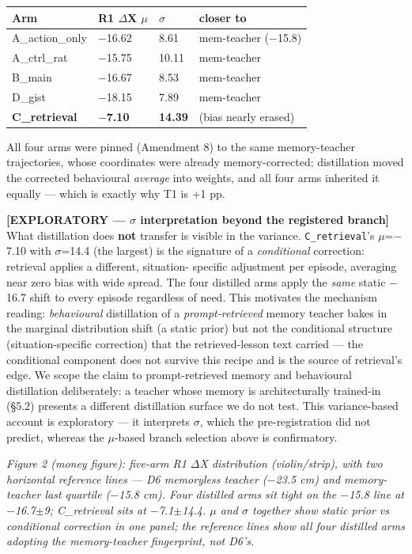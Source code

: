 \begin{table}[h]
\centering
\begin{tabular}{l l l l}
\toprule
Arm & R1 $\Delta$X $\mu$ & $\sigma$ & closer to \\
\midrule
A\_action\_only & $-$16.62 & 8.61 & mem-teacher ($-$15.8) \\
A\_ctrl\_rat & $-$15.75 & 10.11 & mem-teacher \\
B\_main & $-$16.67 & 8.53 & mem-teacher \\
D\_gist & $-$18.15 & 7.89 & mem-teacher \\
\textbf{C\_retrieval} & \textbf{$-$7.10} & \textbf{14.39} & (bias nearly erased) \\
\bottomrule
\end{tabular}
\end{table}

All four arms were pinned
(Amendment 8) to the same memory-teacher trajectories, whose coordinates
were already memory-corrected; distillation moved the corrected
behavioural \emph{average} into weights, and all four arms inherited it
equally --- which is exactly why T1 is +1 pp.

\textbf{[EXPLORATORY --- $\sigma$ interpretation beyond the registered branch]} What
distillation does \textbf{not} transfer is visible in the variance.
\texttt{C\_retrieval}'s $\mu$=$-$7.10 with $\sigma$=14.4 (the largest) is the signature of a
\emph{conditional} correction: retrieval applies a different, situation-
specific adjustment per episode, averaging near zero bias with wide
spread. The four distilled arms apply the \emph{same} static $-$16.7 shift to
every episode regardless of need. This motivates the mechanism reading:
\emph{behavioural} distillation of a \emph{prompt-retrieved} memory teacher bakes
in the marginal distribution shift (a static prior) but not the
conditional structure (situation-specific correction) that the
retrieved-lesson text carried --- the conditional component does not
survive this recipe and is the source of retrieval's edge. We scope the
claim to prompt-retrieved memory and behavioural distillation
deliberately: a teacher whose memory is architecturally trained-in
(\S5.2) presents a different distillation surface we do not test. This
variance-based account is
exploratory --- it interprets $\sigma$, which the pre-registration did not
predict, whereas the $\mu$-based branch selection above is confirmatory.

\emph{Figure 2 (money figure): five-arm R1 $\Delta$X distribution (violin/strip),
with two horizontal reference lines --- D6 memoryless teacher ($-$23.5 cm)
and memory-teacher last quartile ($-$15.8 cm). Four distilled arms sit
tight on the $-$15.8 line at $-$16.7$\pm$9; C\_retrieval sits at $-$7.1$\pm$14.4. $\mu$
and $\sigma$ together show static prior vs conditional correction in one
panel; the reference lines show all four distilled arms adopting the
memory-teacher fingerprint, not D6's.}

